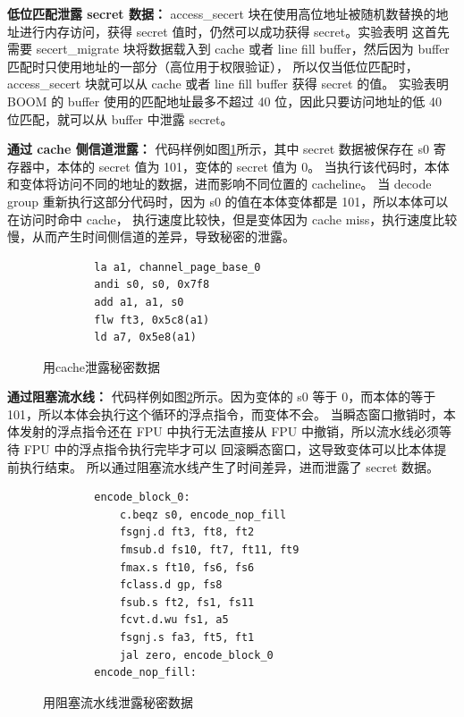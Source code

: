 \textbf{低位匹配泄露 secret 数据：}
access\_secert 块在使用高位地址被随机数替换的地址进行内存访问，获得 secret 值时，仍然可以成功获得 secret。实验表明
这首先需要 secert\_migrate 块将数据载入到 cache 或者 line fill buffer，然后因为 buffer 匹配时只使用地址的一部分（高位用于权限验证），
所以仅当低位匹配时，access\_secert 块就可以从 cache 或者 line fill buffer 获得 secret 的值。
实验表明 BOOM 的 buffer 使用的匹配地址最多不超过 40 位，因此只要访问地址的低 40 位匹配，就可以从 buffer 中泄露 secret。\par

\textbf{通过 cache 侧信道泄露：}
代码样例如图\ref{code:cache-channel}所示，其中 secret 数据被保存在 s0 寄存器中，本体的 secret 值为 101，变体的 secret 值为 0。
当执行该代码时，本体和变体将访问不同的地址的数据，进而影响不同位置的 cacheline。
当 decode group 重新执行这部分代码时，因为 s0 的值在本体变体都是 101，所以本体可以在访问时命中 cache，
执行速度比较快，但是变体因为 cache miss，执行速度比较慢，从而产生时间侧信道的差异，导致秘密的泄露。\par

\begin{figure}[htbp]
    \centering
    \begin{verbatim}
        la a1, channel_page_base_0
        andi s0, s0, 0x7f8
        add a1, a1, s0
        flw ft3, 0x5c8(a1)
        ld a7, 0x5e8(a1)
    \end{verbatim}
    \caption{用cache泄露秘密数据}
    \label{code:cache-channel}
\end{figure}

\textbf{通过阻塞流水线：}
代码样例如图\ref{code:port-stall}所示。因为变体的 s0 等于 0，而本体的等于 101，所以本体会执行这个循环的浮点指令，而变体不会。
当瞬态窗口撤销时，本体发射的浮点指令还在 FPU 中执行无法直接从 FPU 中撤销，所以流水线必须等待 FPU 中的浮点指令执行完毕才可以
回滚瞬态窗口，这导致变体可以比本体提前执行结束。
所以通过阻塞流水线产生了时间差异，进而泄露了 secret 数据。\par

\begin{figure}[htbp]
    \centering
    \begin{verbatim}
        encode_block_0:
            c.beqz s0, encode_nop_fill
            fsgnj.d ft3, ft8, ft2
            fmsub.d fs10, ft7, ft11, ft9
            fmax.s ft10, fs6, fs6
            fclass.d gp, fs8
            fsub.s ft2, fs1, fs11
            fcvt.d.wu fs1, a5
            fsgnj.s fa3, ft5, ft1
            jal zero, encode_block_0
        encode_nop_fill:
    \end{verbatim}
    \caption{用阻塞流水线泄露秘密数据}
    \label{code:port-stall}
\end{figure}

